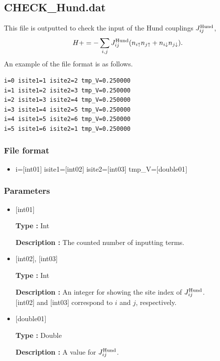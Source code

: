 \newpage
\subsection{CHECK\_Hund.dat}
This file is outputted to check the input of the Hund couplings $J_{ij}^{\rm Hund}$,
\begin{align}
H += -\sum_{i,j}J_{ij}^{\rm Hund} (n_{i\uparrow}n_{j\uparrow}+n_{i\downarrow}n_{j\downarrow}).
\end{align}
An example of the file format is as follows.

\begin{minipage}{12.5cm}
\begin{screen}
\begin{verbatim}
i=0 isite1=1 isite2=2 tmp_V=0.250000 
i=1 isite1=2 isite2=3 tmp_V=0.250000 
i=2 isite1=3 isite2=4 tmp_V=0.250000 
i=3 isite1=4 isite2=5 tmp_V=0.250000 
i=4 isite1=5 isite2=6 tmp_V=0.250000 
i=5 isite1=6 isite2=1 tmp_V=0.250000 
\end{verbatim}
\end{screen}
\end{minipage}

\subsubsection{File format}
 \begin{itemize}
   \item  i=$[$int01$]$ isite1=$[$int02$]$ isite2=$[$int03$]$ tmp\_V=$[$double01$]$ 
 \end{itemize}
 
\subsubsection{Parameters}
 \begin{itemize}

    \item  $[$int01$]$ 
   
    {\bf Type :} Int

   {\bf Description :} The counted number of inputting terms. 
      
   \item  $[$int02$]$, $[$int03$]$
   
    {\bf Type :} Int

    {\bf Description :}  An integer for showing the site index of $J_{ij}^{\rm Hund}$. \\
    $[$int02$]$ and $[$int03$]$ correspond to $i$ and $j$, respectively.
 
   \item  $[$double01$]$ 
   
    {\bf Type :} Double

   {\bf Description :} A value for $J_{ij}^{\rm Hund}$.
\end{itemize}

